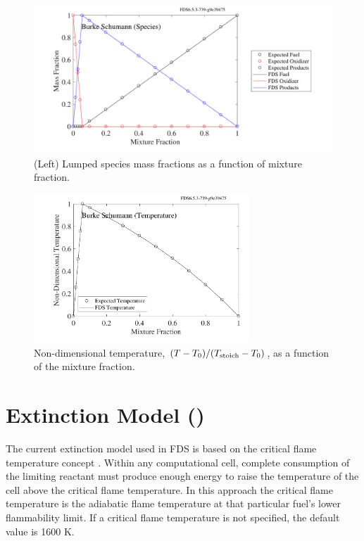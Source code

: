 \documentclass[11pt]{book}
\begin{document}
\begin{figure}[!ht]
\centering
\includegraphics[height=2.2in]{SCRIPT_FIGURES/burke_schumann_spec}
\caption[Mixture fraction state relations for species ()]{(Left) Lumped species mass fractions as a function of mixture fraction.}
\label{fig:burke_schumann_spec}
\end{figure}

\begin{figure}[!ht]
\centering
\includegraphics[height=2.2in]{SCRIPT_FIGURES/burke_schumann_temp}
\caption[Mixture fraction state relations for temperature ()]{Non-dimensional temperature, $(T-T_0)/(T_{\rm stoich} - T_0)$, as a function of the mixture fraction.}
\label{fig:burke_schumann_temp}
\end{figure}



\clearpage

\section{Extinction Model ()}
\label{Extinct}

The current extinction model used in FDS is based on the critical flame temperature concept \cite{SFPE:Beyler}. Within any computational cell, complete consumption of the limiting reactant must produce enough energy to raise the temperature of the cell above the critical flame temperature. In this approach the critical flame temperature is the adiabatic flame temperature at that particular fuel's lower flammability limit. If a critical flame temperature is not specified, the default value is 1600 K.
\end{document}
